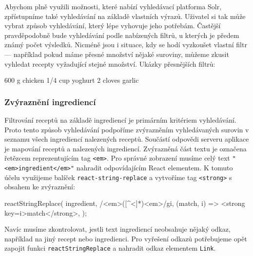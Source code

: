 Abychom plně využili možnosti, které nabízí vyhledávací platforma Solr, zpřístupníme také vyhledávání na základě vlastních výrazů. Uživatel si tak může vybrat způsob vyhledávání, který lépe vyhovuje jeho potřebám. Častější pravděpodobně bude vyhledávání podle nabízených filtrů, u kterých je předem známý počet výsledků. Nicméně jsou i situace, kdy se hodí vyzkoušet vlastní filtr --- například pokud máme přesné množství nějaké suroviny, můžeme zkusit vyhledat recepty vyžadující stejné množství. Ukázky přesnějších filtrů:
\begin{code}
600 g chicken
1/4 cup yoghurt
2 cloves garlic
\end{code}

\subsubsection{Zvýraznění ingrediencí}

Filtrování receptů na základě ingrediencí je primárním kritériem vyhledávání. Proto tento způsob vyhledávání podpoříme zvýrazněním vyhledávaných surovin v seznamu všech ingrediencí nalezených receptů. Součástí odpovědi serveru aplikace je mapování receptů a nalezených ingrediencí. Zvýrazněná část textu je označena řetězcem reprezentujícím tag \texttt{<em>}. Pro správné zobrazení musíme celý text \texttt{"}\texttt{<em>ingredient</em>"} nahradit odpovídajícím React elementem. K tomuto účelu využijeme balíček \texttt{react-string-replace} a vytvoříme tag \texttt{<strong>} s obsahem ke zvýraznění:
\begingroup
\samepage
\begin{code}
reactStringReplace(
  ingredient,
  /<em>([^<]*)<\/em>/gi,
  (match, i) => <strong key={i}>{match}</strong>,
);
\end{code}
\endgroup
Navíc musíme zkontrolovat, jestli text ingrediencí neobsahuje nějaký odkaz, například na jiný recept nebo ingredienci. Pro vyřešení odkazů potřebujeme opět zapojit funkci \texttt{reactStringReplace} a nahradit odkaz elementem \texttt{Link}.
